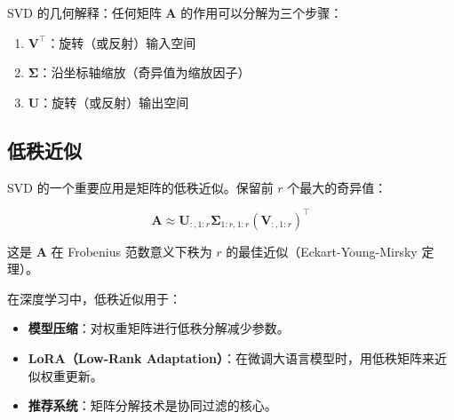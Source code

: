 SVD 的几何解释：任何矩阵 $\mathbf{A}$ 的作用可以分解为三个步骤：
\begin{enumerate}
    \item $\mathbf{V}^{\top}$：旋转（或反射）输入空间
    \item $\boldsymbol{\Sigma}$：沿坐标轴缩放（奇异值为缩放因子）
    \item $\mathbf{U}$：旋转（或反射）输出空间
\end{enumerate}

\subsection{低秩近似}

SVD 的一个重要应用是矩阵的低秩近似。保留前 $r$ 个最大的奇异值：

\[
\mathbf{A} \approx \mathbf{U}_{:,1:r} \boldsymbol{\Sigma}_{1:r,1:r} (\mathbf{V}_{:,1:r})^{\top}
\]

这是 $\mathbf{A}$ 在 Frobenius 范数意义下秩为 $r$ 的最佳近似（Eckart-Young-Mirsky 定理）。

在深度学习中，低秩近似用于：
\begin{itemize}
    \item \textbf{模型压缩}：对权重矩阵进行低秩分解减少参数。
    \item \textbf{LoRA（Low-Rank Adaptation）}：在微调大语言模型时，用低秩矩阵来近似权重更新。
    \item \textbf{推荐系统}：矩阵分解技术是协同过滤的核心。
\end{itemize}

